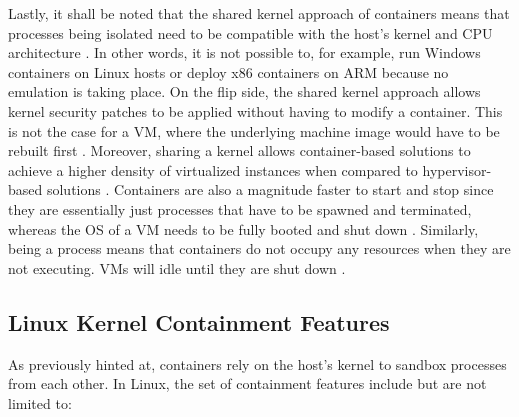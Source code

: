 Lastly, it shall be noted that the shared kernel approach of containers means that processes being isolated need to be compatible with the host's kernel and \acs{CPU} architecture \cite[p.~386]{morabito2015hypervisors} \cite[p.~2]{eder2016hypervisor}. In other words, it is not possible to, for example, run Windows containers on Linux hosts or deploy x86 containers on \acs{ARM} because no emulation is taking place. On the flip side, the shared kernel approach allows kernel security patches to be applied without having to modify a container. This is not the case for a \acs{VM}, where the underlying machine image would have to be rebuilt first \cite[p.~3]{eder2016hypervisor}. Moreover, sharing a kernel allows container-based solutions to achieve a higher density of virtualized instances when compared to hypervisor-based solutions \cite[p.~386]{morabito2015hypervisors} \cite[p.~204]{kang2016container}. Containers are also a magnitude faster to start and stop since they are essentially just processes that have to be spawned and terminated, whereas the \acs{OS} of a \acs{VM} needs to be fully booted and shut down \cite[p.~2]{merkel2014docker} \cite[p.~2]{eder2016hypervisor}. Similarly, being a process means that containers do not occupy any resources when they are not executing. \acsp{VM} will idle until they are shut down \cite[p.~2]{merkel2014docker}.


\subsection{Linux Kernel Containment Features}
\label{sec:linux-kernel-containment-features}

As previously hinted at, containers rely on the host's kernel to sandbox processes from each other. In Linux, the set of containment features include but are not limited to:

